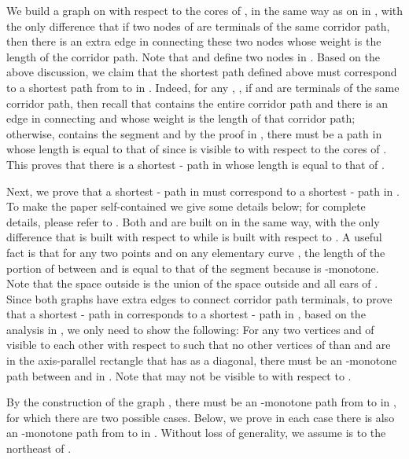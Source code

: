 \documentclass[english,runningheads,11pt]{llncs}
\newenvironment{proof}{\noindent {\textbf{Proof:}}\rm}{\hfill \rm}
\begin{document}
\begin{proof}
We build a graph  on  with
respect to the cores of , in the same way as  on  in
\cite{ref:ChenSh00,ref:ClarksonRe87,ref:ClarksonRe88}, with the only
difference that if two nodes of  are terminals of the same corridor
path, then there is an extra edge in  connecting these two nodes whose
weight is the length of the corridor path. Note that
 and  define two nodes in . Based on the above discussion,
we claim that the shortest path  defined above must correspond to a
shortest path from  to  in . Indeed, for any , , if  and  are terminals of the same corridor
path, then recall that  contains the entire corridor path and
there is an edge in  connecting  and  whose weight
is the length of that corridor path; otherwise, 
contains the segment  and by the proof in
\cite{ref:ClarksonRe87,ref:ClarksonRe88}, there must be a path in
 whose length is equal to that of
 since  is visible to  with
respect to the cores of . This proves that there is a shortest
- path in  whose length is equal to that of .

Next, we prove that a shortest - path in  must
correspond to a shortest - path in .
To make the paper self-contained we give some details below; for complete details, please refer to \cite{ref:InkuluPl09,ref:ChenA11ESA,ref:ChenCo12arXiv}.
Both  and  are built on 
in the same way, with
the only difference that  is built
with respect to  while  is built
with respect to . A useful fact is that for
any two points  and  on any elementary curve , the length of the portion of  between
 and  is equal to that of the segment  because  is -monotone.
Note that the space outside  is the union
of the space outside  and all ears of .
Since both graphs have extra edges to connect corridor
path terminals, to prove that a shortest - path in 
corresponds to a shortest - path in ,
based on the analysis in \cite{ref:ClarksonRe87,ref:ClarksonRe88}, we
only need to show the following: For any two vertices  and  of
 visible to each other with respect to  such
that no other vertices of  than  and  are in
the axis-parallel rectangle  that has  as a diagonal,
there must be an -monotone path between  and  in
. Note that  may not be visible to  with respect
to .

By the construction of the graph 
\cite{ref:ClarksonRe87,ref:ClarksonRe88}, there must be an -monotone path from  to  in , for which there are two possible cases. Below, we
prove in each case there is also an -monotone path from 
to  in . Without loss of generality, we assume  is
to the northeast of .


\end{proof}
\end{document}
